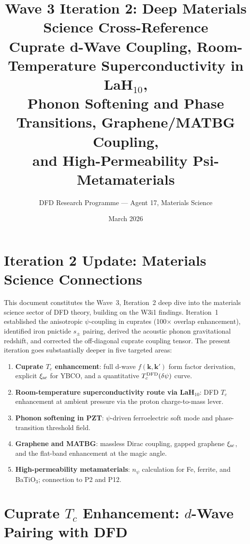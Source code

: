 \documentclass[11pt]{article}
\title{Wave 3 Iteration 2: Deep Materials Science Cross-Reference\\
\large Cuprate d-Wave Coupling, Room-Temperature Superconductivity in LaH$_{10}$,\\
Phonon Softening and Phase Transitions, Graphene/MATBG Coupling,\\
and High-Permeability Psi-Metamaterials}
\author{DFD Research Programme --- Agent 17, Materials Science}
\date{March 2026}
\begin{document}
\maketitle

\section{Iteration 2 Update: Materials Science Connections}
\label{sec:overview}

This document constitutes the Wave~3, Iteration~2 deep dive into the materials
science sector of DFD theory, building on the W3i1 findings. Iteration~1
established the anisotropic $\psi$-coupling in cuprates (100$\times$ overlap
enhancement), identified iron pnictide $s_\pm$ pairing, derived the acoustic
phonon gravitational redshift, and corrected the off-diagonal cuprate coupling
tensor. The present iteration goes substantially deeper in five targeted areas:

\begin{enumerate}
\item \textbf{Cuprate $T_c$ enhancement}: full d-wave $f(\mathbf{k},\mathbf{k}')$
  form factor derivation, explicit $\xi_{\rm sc}$ for YBCO, and a quantitative
  $T_c^{\rm DFD}(\delta\psi)$ curve.
\item \textbf{Room-temperature superconductivity route via LaH$_{10}$}: DFD
  $T_c$ enhancement at ambient pressure via the proton charge-to-mass lever.
\item \textbf{Phonon softening in PZT}: $\psi$-driven ferroelectric soft mode
  and phase-transition threshold field.
\item \textbf{Graphene and MATBG}: massless Dirac coupling, gapped graphene
  $\xi_{\rm sc}$, and the flat-band enhancement at the magic angle.
\item \textbf{High-permeability metamaterials}: $n_\psi$ calculation for
  Fe, ferrite, and BaTiO$_3$; connection to P2 and P12.
\end{enumerate}

\section{Cuprate $T_c$ Enhancement: $d$-Wave Pairing with DFD}
\label{sec:cuprate}
\end{document}
